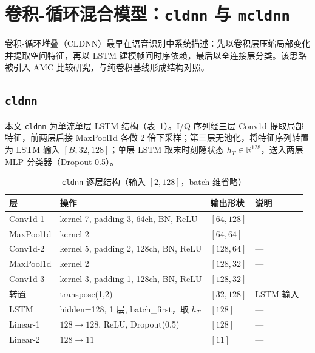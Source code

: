 \section{卷积-循环混合模型：\texttt{cldnn} 与 \texttt{mcldnn}}

卷积-循环堆叠（CLDNN）最早在语音识别中系统描述\cite{sainath2015cldnn}：先以卷积层压缩局部变化并提取空间特征，再以 LSTM\cite{hochreiter1997lstm} 建模帧间时序依赖，最后以全连接层分类。该思路被引入 AMC 比较研究\cite{west2017deep}，与纯卷积基线形成结构对照。

\subsection{\texttt{cldnn}}

本文 \texttt{cldnn} 为单流单层 LSTM 结构（表~\ref{tab:arch-cldnn}）。I/Q 序列经三层 Conv1d 提取局部特征，前两层后接 MaxPool1d 各做 2 倍下采样；第三层无池化，将特征序列转置为 LSTM 输入 \([B,32,128]\)；单层 LSTM 取末时刻隐状态 \(h_T\in\mathbb{R}^{128}\)，送入两层 MLP 分类器（Dropout 0.5）。

\begin{table}[htbp]
  \centering
  \caption{\texttt{cldnn} 逐层结构（输入 \([2,128]\)，batch 维省略）}
  \label{tab:arch-cldnn}
  \small
  \begin{tabular}{llll}
    \toprule
    层 & 操作 & 输出形状 & 说明 \\
    \midrule
    Conv1d-1  & kernel 7, padding 3, 64ch, BN, ReLU  & \([64,128]\) & --- \\
    MaxPool1d & kernel 2                               & \([64, 64]\) & --- \\
    Conv1d-2  & kernel 5, padding 2, 128ch, BN, ReLU & \([128,64]\) & --- \\
    MaxPool1d & kernel 2                               & \([128,32]\) & --- \\
    Conv1d-3  & kernel 3, padding 1, 128ch, BN, ReLU & \([128,32]\) & --- \\
    转置      & transpose(1,2)                         & \([32,128]\) & LSTM 输入 \\
    LSTM      & hidden=128, 1 层, batch\_first，取 \(h_T\) & \([128]\) & --- \\
    Linear-1  & \(128\to128\), ReLU, Dropout(0.5)    & \([128]\)    & --- \\
    Linear-2  & \(128\to11\)                          & \([11]\)     & --- \\
    \bottomrule
  \end{tabular}
\end{table}

